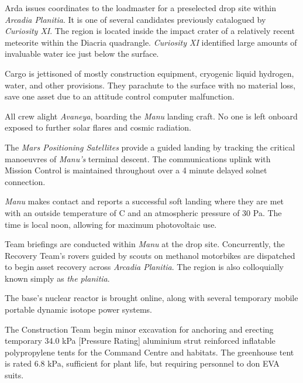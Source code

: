 

Arda issues coordinates to the loadmaster for a preselected drop site within {\it Arcadia Planitia}. It is one of several candidates previously catalogued by {\it Curiosity XI}. The region is located inside the impact crater of a relatively recent meteorite within the Diacria quadrangle. {\it Curiosity XI} identified large amounts of invaluable water ice just below the surface. 

Cargo is jettisoned of mostly construction equipment, cryogenic liquid hydrogen, water, and other provisions. They parachute to the surface with no material loss, save one asset due to an attitude control computer malfunction.
\StopTimelineDate

All crew alight {\it Avaneya}, boarding the {\it Manu} landing craft. No one is left onboard exposed to further solar flares and cosmic radiation.

The {\it Mars Positioning Satellites} provide a guided landing by tracking the critical manoeuvres of {\it Manu's} terminal descent. The communications uplink with Mission Control is maintained throughout over a 4 minute delayed solnet connection.

{\it Manu} makes contact and reports a successful soft landing where they are met with an outside temperature of C and an atmospheric pressure of 30 Pa. The time is local noon, allowing for maximum photovoltaic use.

Team briefings are conducted within {\it Manu} at the drop site. Concurrently, the Recovery Team's rovers guided by scouts on methanol motorbikes are dispatched to begin asset recovery across {\it Arcadia Planitia}. The region is also colloquially known simply as {\it the planitia}.

The base's nuclear reactor is brought online, along with several temporary mobile portable dynamic isotope power systems.

The Construction Team begin minor excavation for anchoring and erecting temporary 34.0 kPa [Pressure Rating] aluminium strut reinforced inflatable polypropylene tents for the Command Centre and habitats. The greenhouse tent is rated 6.8 kPa, sufficient for plant life, but requiring personnel to don EVA suits.
\StopTimelineDate

